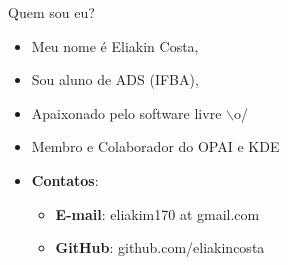 \begin{frame}{Quem sou eu?}
    \begin{itemize}
        \item Meu nome é Eliakin Costa,
        \item Sou aluno de ADS (IFBA),
        \item Apaixonado pelo software livre $\backslash$o/
        \item Membro e Colaborador do OPAI e KDE
        \item \textbf{Contatos}:        
        \begin{itemize}
            \item \textbf{E-mail}: eliakim170 at gmail.com
            \item \textbf{GitHub}: github.com/eliakincosta
        \end{itemize}
    \end{itemize}
\end{frame}
%